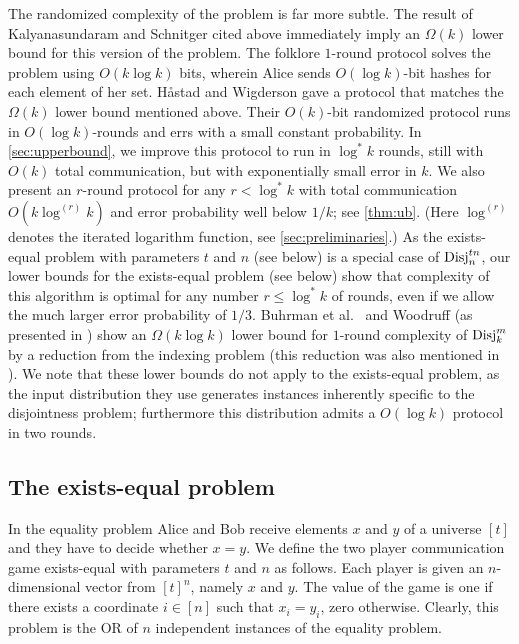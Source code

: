 The randomized complexity of the problem is far more subtle. The
result of Kalyanasundaram and Schnitger cited above immediately 
imply an $\Omega(k)$ lower bound for this version of the problem. 
The folklore $1$-round protocol
solves the problem using $O(k\log k)$ bits, wherein Alice sends
$O(\log k)$-bit hashes for each element of her set. Håstad and
Wigderson \cite{HastadW2007} gave a protocol that matches the
$\Omega(k)$ lower bound mentioned above. Their $O(k)$-bit
randomized protocol runs in $O(\log k)$-rounds and errs with a
small constant probability. In \autoref{sec:upperbound}, we
improve this protocol to run in $\log^*k$ rounds, still with
$O(k)$ total communication, but with exponentially small error
in $k$. We also present an $r$-round protocol for any
$r<\log^*k$ with total communication $O(k\log^{(r)}k)$ and error
probability well below $1/k$; see \autoref{thm:ub}. (Here
$\log^{(r)}$ denotes the iterated logarithm function, see
\autoref{sec:preliminaries}.) As the exists-equal problem with parameters
$t$ and $n$ (see below) is a special case of $\operatorname{Disj}_n^{tn}$, our
lower bounds for the exists-equal problem (see below) show that
complexity of this algorithm is optimal for any number
$r\le\log^*k$ of rounds, even if we allow the much larger error
probability of $1/3$. Buhrman et al.~\cite{BuhrmanGMW2012} and
Woodruff \cite{Woodruff2008} (as presented in \cite{Patrascu2009})
show an $\Omega(k\log k)$ lower bound for $1$-round complexity
of $\operatorname{Disj}^m_k$ by a reduction from the indexing problem (this 
reduction was also mentioned in \cite{DasguptaKS12}). We
note that these lower bounds do not apply to the exists-equal
problem, as the input distribution they use generates instances
inherently specific to the disjointness problem; furthermore
this distribution admits a $O(\log k)$ protocol in two rounds.

\subsection{The exists-equal problem}
In the equality problem Alice and Bob receive elements $x$ and
$y$ of a universe $[t]$ and they have to decide whether $x=y$.
We define the two player communication game exists-equal with
parameters $t$ and $n$ as follows. Each player is given an
$n$-dimensional vector from $[t]^n$, namely $x$ and $y$. The
value of the game is one if there exists a coordinate $i\in[n]$
such that $x_i = y_i$, zero otherwise. Clearly, this problem is
the OR of $n$ independent instances of the equality problem.

